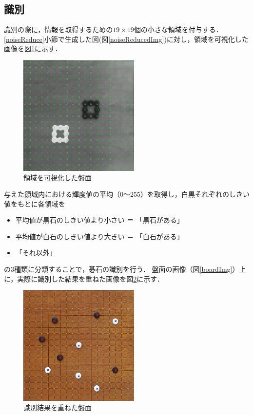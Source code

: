 \documentclass[openright]{nitocs}
\numberwithin{equation}{section}
\begin{document}
        \subsection{識別}
            \label{area}
            識別の際に，情報を取得するための$19\times19$個の小さな領域を付与する．
            \ref{noiseReduce}小節で生成した図(図\ref{noiseReducedImg})に対し，領域を可視化した画像を図\ref{boardWithArea}に示す．
            \begin{figure}[tb] %
                \begin{center}
                \includegraphics[clip,width=60mm]{boardWithAreaImg.jpg} 
                \caption{領域を可視化した盤面}
                \label{boardWithArea}
                \end{center}
            \end{figure}

            与えた領域内における輝度値の平均（0～255）を取得し，白黒それぞれのしきい値をもとに各領域を
            \begin{itemize} %
                \item 平均値が黒石のしきい値より小さい ＝ 「黒石がある」
                \item 平均値が白石のしきい値より大きい ＝ 「白石がある」
                \item 「それ以外」
            \end{itemize}
            の3種類に分類することで，碁石の識別を行う．
            盤面の画像（図\ref{boardImg}）上に，実際に識別した結果を重ねた画像を図\ref{result}に示す．

            \begin{figure}[tb] %
                \begin{center}
                \includegraphics[clip,width=60mm]{result.jpg} 
                \caption{識別結果を重ねた盤面}
                \label{result}
                \end{center}
            \end{figure}
\end{document}
